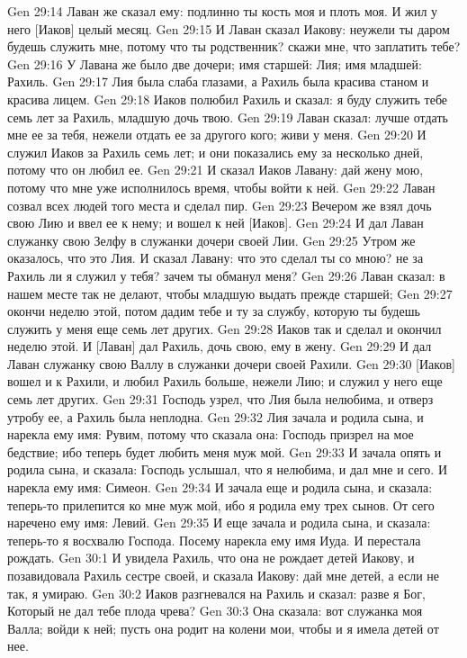 Gen 29:14  Лаван же сказал ему: подлинно ты кость моя и плоть моя. И жил у него [Иаков] целый месяц.
Gen 29:15  И Лаван сказал Иакову: неужели ты даром будешь служить мне, потому что ты родственник? скажи мне, что заплатить тебе?
Gen 29:16  У Лавана же было две дочери; имя старшей: Лия; имя младшей: Рахиль.
Gen 29:17  Лия была слаба глазами, а Рахиль была красива станом и красива лицем.
Gen 29:18  Иаков полюбил Рахиль и сказал: я буду служить тебе семь лет за Рахиль, младшую дочь твою.
Gen 29:19  Лаван сказал: лучше отдать мне ее за тебя, нежели отдать ее за другого кого; живи у меня.
Gen 29:20  И служил Иаков за Рахиль семь лет; и они показались ему за несколько дней, потому что он любил ее.
Gen 29:21  И сказал Иаков Лавану: дай жену мою, потому что мне уже исполнилось время, чтобы войти к ней.
Gen 29:22  Лаван созвал всех людей того места и сделал пир.
Gen 29:23  Вечером же взял дочь свою Лию и ввел ее к нему; и вошел к ней [Иаков].
Gen 29:24  И дал Лаван служанку свою Зелфу в служанки дочери своей Лии.
Gen 29:25  Утром же оказалось, что это Лия. И сказал Лавану: что это сделал ты со мною? не за Рахиль ли я служил у тебя? зачем ты обманул меня?
Gen 29:26  Лаван сказал: в нашем месте так не делают, чтобы младшую выдать прежде старшей;
Gen 29:27  окончи неделю этой, потом дадим тебе и ту за службу, которую ты будешь служить у меня еще семь лет других.
Gen 29:28  Иаков так и сделал и окончил неделю этой. И [Лаван] дал Рахиль, дочь свою, ему в жену.
Gen 29:29  И дал Лаван служанку свою Валлу в служанки дочери своей Рахили.
Gen 29:30  [Иаков] вошел и к Рахили, и любил Рахиль больше, нежели Лию; и служил у него еще семь лет других.
Gen 29:31  Господь узрел, что Лия была нелюбима, и отверз утробу ее, а Рахиль была неплодна.
Gen 29:32  Лия зачала и родила сына, и нарекла ему имя: Рувим, потому что сказала она: Господь призрел на мое бедствие; ибо теперь будет любить меня муж мой.
Gen 29:33  И зачала опять и родила сына, и сказала: Господь услышал, что я нелюбима, и дал мне и сего. И нарекла ему имя: Симеон.
Gen 29:34  И зачала еще и родила сына, и сказала: теперь-то прилепится ко мне муж мой, ибо я родила ему трех сынов. От сего наречено ему имя: Левий.
Gen 29:35  И еще зачала и родила сына, и сказала: теперь-то я восхвалю Господа. Посему нарекла ему имя Иуда. И перестала рождать.
Gen 30:1  И увидела Рахиль, что она не рождает детей Иакову, и позавидовала Рахиль сестре своей, и сказала Иакову: дай мне детей, а если не так, я умираю.
Gen 30:2  Иаков разгневался на Рахиль и сказал: разве я Бог, Который не дал тебе плода чрева?
Gen 30:3  Она сказала: вот служанка моя Валла; войди к ней; пусть она родит на колени мои, чтобы и я имела детей от нее.
